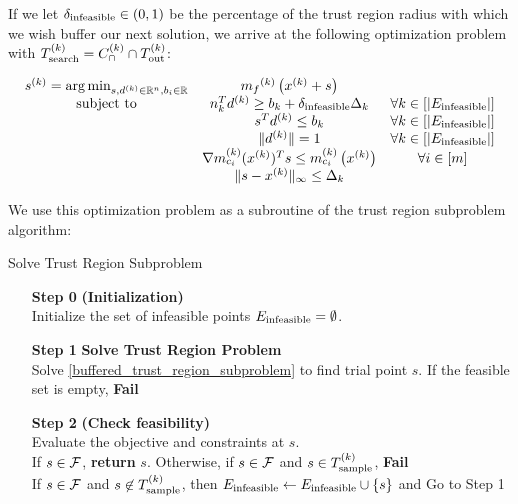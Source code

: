 {If we let ${\delta_\textrm{infeasible}} \in (0, 1)$ be the percentage of the trust region radius with which we wish buffer our next solution, 
we arrive at the following optimization problem with ${T_{\text{search}}^{(k)}} = {C^{(k)}_{\cap}} \cap {T_{\text{out}}^{(k)}} $:

\begin{align}
\label{buffered_trust_region_subproblem}
\begin{array}{ccc}
{{s}^{(k)}} = \operatorname*{arg\,min}_{s, d^{(k)} \in \mathbb R^n, b_i \in \mathbb R}	& {{m}_f}^{(k)}\left(x^{(k)} + s\right) & 	\\
 \mbox{subject to}  & n_k^Td^{(k)} \ge b_k + {\delta_\textrm{infeasible}} \Delta_k& \forall k \in \left[ |{E_\textrm{infeasible}} |\right] \\
 & s^T d^{(k)} \le b_k &   \forall k \in \left[|{E_\textrm{infeasible}} |\right]  \\
 & \|d^{(k)}\| = 1 & \forall k \in \left[|{E_\textrm{infeasible}} |	\right]\\
 & \nabla {{m}^{(k)}_{c_i}}(x^{(k)}) ^T s \le {{m}^{(k)}_{c_i}}\left(x^{(k)}\right) & \forall i \in [m] \\
 & \|s - x^{(k)} \|_{\infty} \le \Delta_k & \\
\end{array}
\end{align}

We use this optimization problem as a subroutine of the trust region subproblem algorithm:

\begin{algorithm}[H]
    \caption{Solve Trust Region Subproblem}
    \label{linear_cut_trust_region_subproblem}
    \begin{itemize}
        \item[\textbf{Step 0}] \textbf{(Initialization)} \\
	    Initialize the set of infeasible points ${E_\textrm{infeasible}} = \emptyset$.
        
        \item[\textbf{Step 1}] \textbf{Solve Trust Region Problem} \\
	    Solve \cref{buffered_trust_region_subproblem} to find trial point $s$.
	    If the feasible set is empty, \textbf{Fail}
        
        \item[\textbf{Step 2}] \textbf{(Check feasibility)} \\
            Evaluate the objective and constraints at $s$. \\
            If $s\in{\mathcal F}$, \textbf{return} $s$.
            Otherwise, if $s\in{\mathcal F}$ and $s \in {T_{\text{sample}}^{(k)}}$, \textbf{Fail} \\
	    	If $s\in{\mathcal F}$ and $s \not \in {T_{\text{sample}}^{(k)}}$, then ${E_\textrm{infeasible}} \gets {E_\textrm{infeasible}} \cup \{s\}$ and Go to Step 1
    \end{itemize}
\end{algorithm}

}
